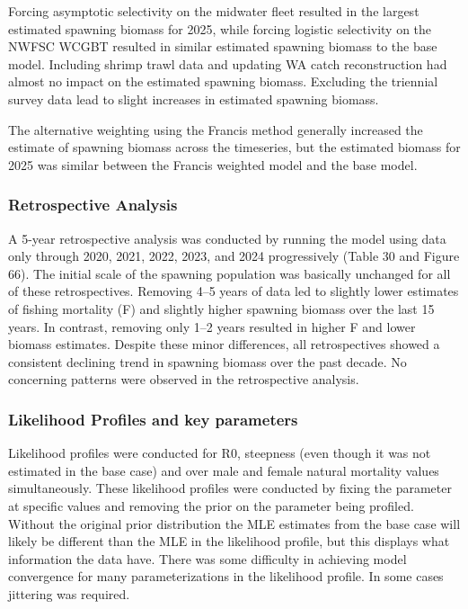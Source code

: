 \documentclass[
]{scrartcl}
\begin{document}
Forcing asymptotic selectivity on the midwater fleet resulted in the
largest estimated spawning biomass for 2025, while forcing logistic
selectivity on the NWFSC WCGBT resulted in similar estimated spawning
biomass to the base model. Including shrimp trawl data and updating WA
catch reconstruction had almost no impact on the estimated spawning
biomass. Excluding the triennial survey data lead to slight increases in
estimated spawning biomass.

The alternative weighting using the Francis method generally increased
the estimate of spawning biomass across the timeseries, but the
estimated biomass for 2025 was similar between the Francis weighted
model and the base model.

\subsubsection{Retrospective Analysis}\label{retrospective-analysis}

A 5-year retrospective analysis was conducted by running the model using
data only through 2020, 2021, 2022, 2023, and 2024 progressively (Table
30 and Figure 66). The initial scale of the spawning population was
basically unchanged for all of these retrospectives. Removing 4--5 years
of data led to slightly lower estimates of fishing mortality (F) and
slightly higher spawning biomass over the last 15 years. In contrast,
removing only 1--2 years resulted in higher F and lower biomass
estimates. Despite these minor differences, all retrospectives showed a
consistent declining trend in spawning biomass over the past decade. No
concerning patterns were observed in the retrospective analysis.

\subsubsection{Likelihood Profiles and key
parameters}\label{likelihood-profiles-and-key-parameters}

Likelihood profiles were conducted for R0, steepness (even though it was
not estimated in the base case) and over male and female natural
mortality values simultaneously. These likelihood profiles were
conducted by fixing the parameter at specific values and removing the
prior on the parameter being profiled. Without the original prior
distribution the MLE estimates from the base case will likely be
different than the MLE in the likelihood profile, but this displays what
information the data have. There was some difficulty in achieving model
convergence for many parameterizations in the likelihood profile. In
some cases jittering was required.
\end{document}
